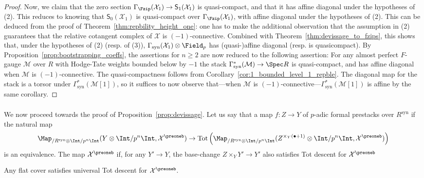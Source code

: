 \documentclass[10pt]{amsart}
\begin{document}
\begin{proof}
Now, we claim that the zero section $\Gamma_{\Fzip}(\mathcal{X}_1)\to \mathsf{S}_1(\mathcal{X}_1)$ is quasi-compact, and that it has affine diagonal under the hypotheses of (2). This reduces to knowing that $\mathsf{S}_0(\mathcal{X}_1)$ is quasi-compact over $\Gamma_{\Fzip}(\mathcal{X}_1)$, with affine diagonal under the hypotheses of (2). This can be deduced from the proof of Theorem~\ref{thm:repbility_height_one}: one has to make the additional observation that the assumption in (2) guarantees that the relative cotangent complex of $\mathcal{X}$ is $(-1)$-connective. Combined with Theorem~\ref{thm:devissage_to_fzips}, this shows that, under the hypotheses of (2) (resp. of (3)), $\Gamma_{\mathrm{syn}}(\mathcal{X}_1)\otimes\Field_p$ has (quasi-)affine diagonal (resp. is quasicompact). By Proposition~\ref{prop:bootstrapping_coeffs}, the assertions for $n\ge 2$ are now reduced to the following assertion: For any almost perfect $F$-gauge $\mathcal{M}$ over $R$ with Hodge-Tate weights bounded below by $-1$ the stack $\Gamma^*_{\mathrm{syn}}(\mathcal{M})\to \Spec R$ is quasi-compact, and has affine diagonal when $\mathcal{M}$ is $(-1)$-connective.  The quasi-compactness follows from Corollary~\ref{cor:1_bounded_level_1_repble}. The diagonal map for the stack is a torsor under $\Gamma^*_{\mathrm{syn}}(\mathcal{M}[1])$, so it suffices to now observe that---when $\mathcal{M}$ is $(-1)$-connective---$\Gamma^*_{\mathrm{syn}}(\mathcal{M}[1])$ is affine by the same corollary.
\end{proof}

\subsubsection{}
We now proceed towards the proof of Proposition~\ref{prop:devissage}. Let us say that a map $f:Z\to Y$ of $p$-adic formal prestacks over $R^{\mathrm{syn}}$  if the natural map
\[
\Map_{/R^{\mathrm{syn}}\otimes\Int/p^n\Int}(Y\otimes\Int/p^n\Int,\mathcal{X}^\preoneb)\to \mathrm{Tot}\left(\Map_{/R^{\mathrm{syn}}\otimes\Int/p^n\Int}(Z^{\times_Y(\bullet + 1)}\otimes\Int/p^n\Int,\mathcal{X}^\preoneb)\right)
\]
is an equivalence. The map  $\mathcal{X}^\preoneb$ if, for any $Y'\to Y$, the base-change $Z\times_YY'\to Y'$ also satisfies Tot descent for $\mathcal{X}^\preoneb$

\begin{remark}
\label{rem:flat_tot_descent}
Any flat cover satisfies universal Tot descent for $\mathcal{X}^\preoneb$.
\end{remark}
\end{document}
